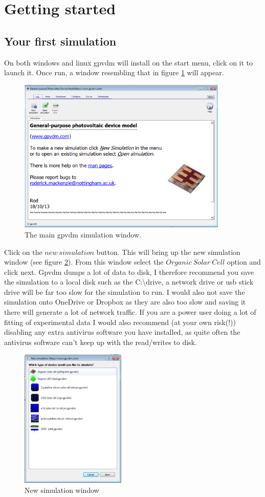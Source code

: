 \newpage
\section{Getting started}

\subsection{Your first simulation}
On both windows and linux gpvdm will install on the start menu, click on it to launch it.  Once run, a window resembling that in figure \ref{fig:new_open} will appear.  

\begin{figure}[H]
\centering
\includegraphics[width=100mm]{./images/new_open.png}
\caption{The main gpvdm simulation window.}
\label{fig:new_open}
\end{figure}

Click on the $new~simulation$ button.  This will bring up the new simulation window (see figure \ref{fig:new_new}).  From this window select the $Organic~Solar~Cell$ option and click next.  Gpvdm dumps a lot of data to disk, I therefore recommend you save the simulation to a local disk such as the C:\textbackslash drive, a network drive or usb stick drive will be far too slow for the simulation to run.  I would also not save the simulation onto OneDrive or Dropbox as they are also too slow and saving it there will generate a lot of network traffic.  If you are a power user doing a lot of fitting of experimental data I would also recommend (at your own risk(!)) disabling any extra antivirus software you have installed, as quite often the antivirus software can't keep up with the read/writes to disk.

\begin{figure}[H]
\centering
\includegraphics[width=50mm]{./images/new.png}
\caption{New simulation window}
\label{fig:new_new}
\end{figure}

